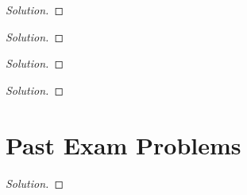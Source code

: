 \begin{problem}
\end{problem}
\begin{proof}[Solution]
\end{proof}

\begin{problem}
\end{problem}
\begin{proof}[Solution]
\end{proof}

\begin{problem}
\end{problem}
\begin{proof}[Solution]
\end{proof}

\begin{problem}
\end{problem}
\begin{proof}[Solution]
\end{proof}

\chapter{Past Exam Problems}
\begin{problem}
\end{problem}
\begin{proof}[Solution]
\end{proof}

